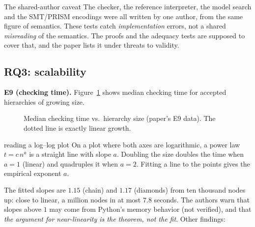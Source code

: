 \begin{warning}{The shared-author caveat}
The checker, the reference interpreter, the model search and the SMT/PRISM encodings were all written by one author, from the same figure of semantics. These tests catch \emph{implementation} errors, not a shared \emph{misreading} of the semantics. The proofs and the adequacy tests are supposed to cover that, and the paper lists it under threats to validity.
\end{warning}

\subsection{RQ3: scalability}

\textbf{E9 (checking time).} Figure~\ref{fig:scale-tut} shows median checking time for accepted hierarchies of growing size.

\begin{figure}[h]
\centering
{}
\caption{Median checking time vs.\ hierarchy size (paper's E9 data). The dotted line is exactly linear growth.}
\label{fig:scale-tut}
\end{figure}

\begin{toolbox}{reading a log--log plot}
On a plot where both axes are logarithmic, a power law $t=c\,n^{a}$ is a straight line with slope $a$. Doubling the size doubles the time when $a=1$ (linear) and quadruples it when $a=2$. Fitting a line to the points gives the empirical exponent $a$.
\end{toolbox}

The fitted slopes are $1.15$ (chain) and $1.17$ (diamonds) from ten thousand nodes up: close to linear, a million nodes in at most $7.8$ seconds. The authors warn that slopes above $1$ may come from Python's memory behavior (not verified), and that \emph{the argument for near-linearity is the theorem, not the fit}. Other findings:


